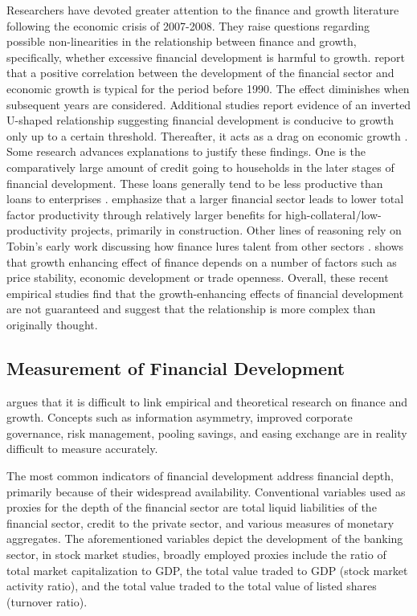 Researchers have devoted greater attention to the finance and growth literature following the economic crisis of 2007-2008. They raise questions regarding possible non-linearities in the relationship between finance and growth, specifically, whether excessive financial development is harmful to growth. \citet{RousseauWachtel2011} report that a positive correlation between the development of the financial sector and economic growth is typical for the period before 1990. The effect diminishes when subsequent years are considered. Additional studies report evidence of an inverted U-shaped relationship suggesting financial development is conducive to growth only up to a certain threshold. Thereafter, it acts as a drag on economic growth \citep{CecchettiKharroubi2012,Arcandetal2012,LawSingh2014}. Some research advances explanations to justify these findings. One is the comparatively large amount of credit going to households in the later stages of financial development. These loans generally tend to be less productive than loans to enterprises \citep{Becketal2012}. \citet{CecchettiKharroubi2013} emphasize that a larger financial sector leads to lower total factor productivity through relatively larger benefits for high-collateral/low-productivity projects, primarily in construction. Other lines of reasoning rely on Tobin's early work discussing how finance lures talent from other sectors \citep{Boltonetal2011,CecchettiKharroubi2012,Kneer2013}. \citet{Yilmazkuday} shows that growth enhancing effect of finance depends on a number of factors such as price stability, economic development or trade openness. Overall, these recent empirical studies find that the growth-enhancing effects of financial development are not guaranteed and suggest that the relationship is more complex than originally thought.

\subsection{Measurement of Financial Development}
\citet{Levine2005} argues that it is difficult to link empirical and theoretical research on finance and growth. Concepts such as information asymmetry, improved corporate governance, risk management, pooling savings, and easing exchange are in reality difficult to measure accurately.

The most common indicators of financial development address financial depth, primarily because of their widespread availability. Conventional variables used as proxies for the depth of the financial sector are total liquid liabilities of the financial sector, credit to the private sector, and various measures of monetary aggregates. The aforementioned variables depict the development of the banking sector, in stock market studies, broadly employed proxies include the ratio of total market capitalization to GDP, the total value traded to GDP (stock market activity ratio), and the total value traded to the total value of listed shares (turnover ratio).  

